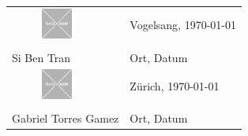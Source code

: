 \noindent
\begin{tabular}{ll}
    \includegraphics[width=3.0cm, height=1.0cm]{01-images/01-setup/04-placeholder.png} &  Vogelsang, \today \\
    \hrulefill                  & \hrulefill        \\
    Si Ben Tran                 & Ort, Datum        \\[1.5cm]
    
    \includegraphics[width=3.0cm, height=1.0cm]{01-images/01-setup/04-placeholder.png} & Zürich, \today  \\
    \hrulefill                  & \hrulefill        \\
    Gabriel Torres Gamez        & Ort, Datum        \\[1.5cm]
\end{tabular}
